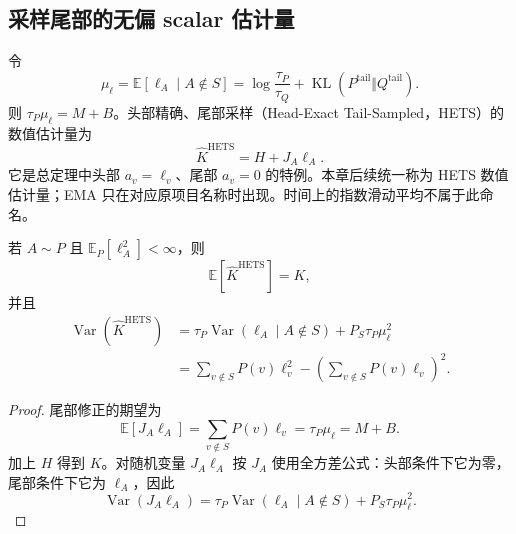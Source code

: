 \documentclass[lang=cn,scheme=chinese,openany]{../book/elegantbook}
\newcommand{\E}{\mathbb E}
\newcommand{\KL}{\operatorname{KL}}
\newcommand{\Var}{\operatorname{Var}}
\newcommand{\tail}{\mathrm{tail}}
\begin{document}
\subsection{采样尾部的无偏 scalar 估计量}

令
\begin{equation*}
 \mu_\ell=\E[\ell_A\mid A\notin S]
 =\log\frac{\tau_P}{\tau_Q}+\KL(P^{\tail}\Vert Q^{\tail}).
\end{equation*}
则 $\tau_P\mu_\ell=M+B$。头部精确、尾部采样（Head-Exact Tail-Sampled，HETS）的数值估计量为
\begin{equation}
 \widehat K^{\mathrm{HETS}}=H+J_A \ell_A.
 \label{est:eq:chapter3-ema-scalar}
\end{equation}
它是总定理中头部 $a_v=\ell_v$、尾部 $a_v=0$ 的特例。本章后续统一称为 HETS 数值估计量；EMA 只在对应原项目名称时出现。时间上的指数滑动平均不属于此命名。

\begin{theorem}
\label{est:thm:chapter3-ema-scalar}
若 $A\sim P$ 且 $\E_P[\ell_A^2]<\infty$，则
\begin{equation*}
 \E[\widehat K^{\mathrm{HETS}}]=K,
\end{equation*}
并且
\begin{align}
 \Var(\widehat K^{\mathrm{HETS}})
 &=\tau_P\Var(\ell_A\mid A\notin S)+P_S\tau_P\mu_\ell^2\\
 &=\sum_{v\notin S}P(v)\ell_v^2
   -\left(\sum_{v\notin S}P(v)\ell_v\right)^2.
 \label{est:eq:chapter3-ema-scalar-var}
\end{align}
\end{theorem}

\begin{proof}
尾部修正的期望为
\begin{equation*}
 \E[J_A \ell_A]=\sum_{v\notin S}P(v)\ell_v=\tau_P\mu_\ell=M+B.
\end{equation*}
加上 $H$ 得到 $K$。对随机变量 $J_A \ell_A$ 按 $J_A$ 使用全方差公式：头部条件下它为零，尾部条件下它为 $\ell_A$，因此
\begin{equation*}
 \Var(J_A \ell_A)=\tau_P\Var(\ell_A\mid A\notin S)+P_S\tau_P\mu_\ell^2.
\end{equation*}
\end{proof}
\end{document}
